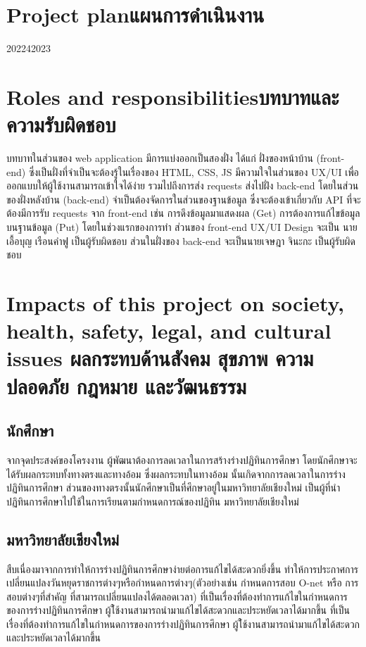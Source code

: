 \pagebreak
\section{\ifenglish Project plan\else แผนการดำเนินงาน\fi}
\begin{plan}{1}{2022}{4}{2023}
\end{plan}


\section{\ifenglish Roles and responsibilities\else บทบาทและความรับผิดชอบ\fi}
บทบาทในส่วนของ web application มีการแบ่งออกเป็นสองฝั่ง ได้แก่ 
%
ฝั่งของหน้าบ้าน (front-end) ซึ่งเป็นฝั่งที่จำเป็นจะต้องรู้ในเรื่องของ HTML, CSS, JS มีความใจในส่วนของ UX/UI เพื่อออกแบบให้ผู้ใช้งานสามารถเข้าใจได้ง่าย 
%
รวมไปถึงการส่ง requests ส่งไปฝั่ง back-end โดยในส่วนของฝั่งหลังบ้าน (back-end) จำเป็นต้องจัดการในส่วนของฐานข้อมูล ซึ่งจะต้องเข้าเกี่ยวกับ API 
%
ที่จะต้องมีการรับ requests จาก front-end เช่น การดึงข้อมูลมาแสดงผล (Get) การต้องการแก้ไขข้อมูลบนฐานข้อมูล (Put)  
%
โดยในช่วงแรกของการทำ ส่วนของ front-end UX/UI Design จะเป็น นายเอื้อบุญ เรือนคำฟู เป็นผู้รับผิดชอบ  
%
ส่วนในฝั่งของ back-end จะเป็นนายเจษฎา จินะกะ เป็นผู้รับผิดชอบ
\section{\ifenglish%
Impacts of this project on society, health, safety, legal, and cultural issues
\else%
ผลกระทบด้านสังคม สุขภาพ ความปลอดภัย กฎหมาย และวัฒนธรรม
\fi}

\subsection{นักศึกษา}
    จากจุดประสงค์ของโครงงาน ผู้พัฒนาต้องการลดเวลาในการสร้างร่างปฏิทินการศึกษา โดยนักศึกษาจะได้รับผลกระทบทั้งทางตรงและทางอ้อม ซึ่งผลกระทบในทางอ้อม
%
นั้นเกิดจากการลดเวลาในการร่างปฏิทินการศึกษา ส่วนของทางตรงนั้นนักศึกษาเป็นที่ศึกษาอยู่ในมหาวิทยาลัยเชียงใหม่ เป็นผู้ที่นำปฏิทินการศึกษาไปใช้ในการเรียนตามกำหนดการณ์ของปฏิทิน มหาวิทยาลัยเชียงใหม่

\subsection{มหาวิทยาลัยเชียงใหม่}
    สืบเนื่องมาจากการทำให้การร่างปฏิทินการศึกษาง่ายต่อการแก้ไขได้สะดวกยิ่งขึ้น ทำให้การประกาศการเปลี่ยนแปลงวันหยุดราชการต่างๆหรือกำหนดการต่างๆ(ตัวอย่างเช่น กำหนดการสอบ O-net หรือ การสอบต่างๆที่สำคัญ ที่สามารถเปลี่ยนแปลงได้ตลอดเวลา)
ที่เป็นเรื่องที่ต้องทำการแก้ไขในกำหนดการของการร่างปฏิทินการศึกษา ผู้ใ้ช้งานสามารถนำมาแก้ไขได้สะดวกและประหยัดเวลาได้มากขึ้น 
%
ที่เป็นเรื่องที่ต้องทำการแก้ไขในกำหนดการของการร่างปฏิทินการศึกษา ผู้ใ้ช้งานสามารถนำมาแก้ไขได้สะดวกและประหยัดเวลาได้มากขึ้น 

